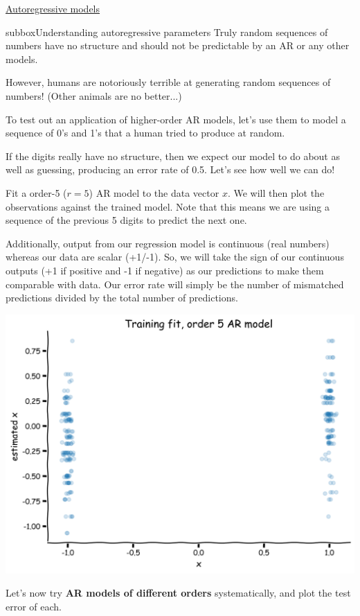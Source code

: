 \begin{textbox}{\href{https://compneuro.neuromatch.io/tutorials/W2D2_LinearSystems/student/W2D2_Tutorial4.html}{Autoregressive models } }

\begin{subbox}{subbox}{Understanding autoregressive parameters}
\scriptsize
Truly random sequences of numbers have no structure and should not be predictable by an AR or any other models.

However, humans are notoriously terrible at generating random sequences of numbers! (Other animals are no better...)

To test out an application of higher-order AR models, let's use them to model a sequence of 0's and 1's that a human tried to produce at random. 

If the digits really have no structure, then we expect our model to do about as well as guessing, producing an error rate of 0.5. Let's see how well we can do!

Fit a order-5 ($r=5$) AR model to the data vector $x$. We will then plot the observations against the trained model. Note that this means we are using a sequence of the previous 5 digits to predict the next one. 

Additionally, output from our regression model is continuous (real numbers) whereas our data are scalar (+1/-1). So, we will take the sign of our continuous outputs (+1 if positive and -1 if negative) as our predictions to make them comparable with data. Our error rate will simply be the number of mismatched predictions divided by the total number of predictions.
\begin{center}
\includegraphics[scale=0.15]{Figures/LS/CDS_Figure12.png}
\end{center}
Let's now try \textbf{AR models of different orders} systematically, and plot the test error of each.


\end{subbox}
\end{textbox}
